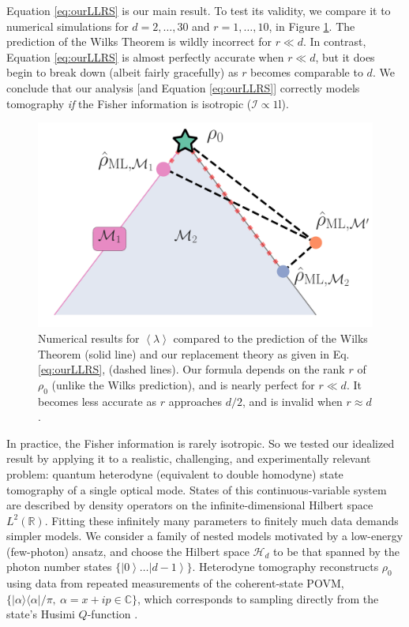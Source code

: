 \documentclass[aps,pra, twocolumn]{revtex4}
\newcommand{\reals}{\mathbb{R}}
\newcommand{\ket}[1]{\ensuremath{\left|#1\right\rangle}}
\newcommand{\expect}[1]{\ensuremath{\left\langle#1\right\rangle}}
\def\Id{1\!\mathrm{l}}
\newcommand{\Fi}{\mathcal{I}}
\begin{document}
Equation \eqref{eq:ourLLRS} is our main result.  To test its validity, we compare it to numerical simulations for $d=2,\ldots,30$ and $r=1,\ldots,10$, in Figure \ref{fig:modelcomp-iso}.  The prediction of the Wilks Theorem is wildly incorrect for $r\ll d$. In contrast, Equation \ref{eq:ourLLRS} is almost perfectly accurate when $r \ll d$, but it does begin to break down (albeit fairly gracefully) as $r$ becomes comparable to $d$.  We conclude that our analysis [and Equation \eqref{eq:ourLLRS}] correctly models tomography \emph{if} the Fisher information is isotropic ($\Fi \propto \Id$).

\begin{figure}[h]
 \includegraphics[width=\columnwidth]{Images/Figure_3.pdf}
 \caption{Numerical results for $\expect{\lambda}$ compared to the prediction of the Wilks Theorem (solid line) and our replacement theory as given in Eq. \ref{eq:ourLLRS}, (dashed lines).  Our formula depends on the rank $r$ of $\rho_0$ (unlike the Wilks prediction), and is nearly perfect for $r\ll d$.  It becomes less accurate as $r$ approaches $d/2$, and is invalid when $r\approx d$.}
 \label{fig:modelcomp-iso}
\end{figure}

In practice, the Fisher information is rarely isotropic.  So we tested our idealized result by applying it to a realistic, challenging, and experimentally relevant problem: quantum heterodyne (equivalent to double homodyne) state tomography \cite{Lvovsky2001a, Bertrand1987, Leonhardt1995, Lvovsky2009} of a single optical mode.  States of this continuous-variable system are described by density operators on the infinite-dimensional Hilbert space $L^2(\reals)$.  Fitting these infinitely many parameters to finitely much data demands simpler models.
We consider a family of nested models motivated by a low-energy (few-photon) ansatz, and choose   
the Hilbert space $\mathcal{H}_d$ to be that spanned by the photon number states $\{\ket{0}\ldots\ket{d-1}\}$.
Heterodyne tomography reconstructs $\rho_{0}$ using data from repeated measurements of the 
coherent-state POVM, $\{|\alpha\rangle\langle \alpha| /\pi, ~\alpha=x+ip\in \mathbb{C}\}$, which corresponds to sampling directly from the 
state's Husimi $Q$-function \cite{Husimi1940}.
\end{document}
